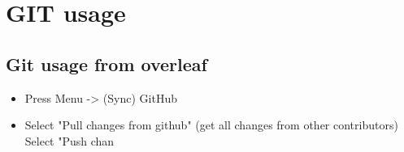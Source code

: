 \chapter{GIT usage}

\section{Git usage from overleaf}

\begin{itemize}
    \item Press Menu -> (Sync) GitHub
    \item Select "Pull changes from github" (get all changes from other contributors)
    \time Select "Push chan
\end{itemize}
